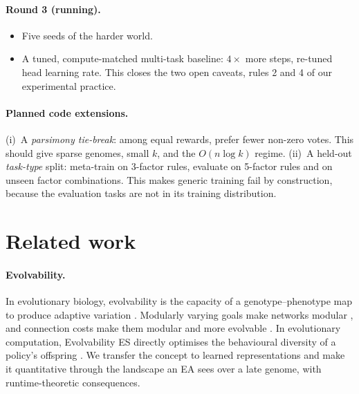 \documentclass[11pt,a4paper]{article}
\theoremstyle{definition}
\theoremstyle{plain}
\theoremstyle{remark}
\begin{document}
\paragraph{Round 3 (running).}
\begin{itemize}
\item Five seeds of the harder world.
\item A tuned, compute-matched multi-task baseline: $4\times$ more steps, re-tuned head learning rate. This closes the two open caveats, rules 2 and 4 of our experimental practice.
\end{itemize}

\paragraph{Planned code extensions.} (i)~A \emph{parsimony tie-break}: among equal rewards, prefer fewer non-zero votes. This should give sparse genomes, small $k$, and the $O(n\log k)$ regime. (ii)~A held-out \emph{task-type} split: meta-train on 3-factor rules, evaluate on 5-factor rules and on unseen factor combinations. This makes generic training fail by construction, because the evaluation tasks are not in its training distribution.

\section{Related work}
\label{sec:related}

\paragraph{Evolvability.}
In evolutionary biology, evolvability is the capacity of a genotype--phenotype map to produce adaptive variation \cite{wagner1996complex}. Modularly varying goals make networks modular \cite{kashtan2005spontaneous}, and connection costs make them modular and more evolvable \cite{clune2013modularity}. In evolutionary computation, Evolvability ES directly optimises the behavioural diversity of a policy's offspring \cite{gajewski2019evolvability}. We transfer the concept to learned representations and make it quantitative through the landscape an EA sees over a late genome, with runtime-theoretic consequences.
\end{document}

